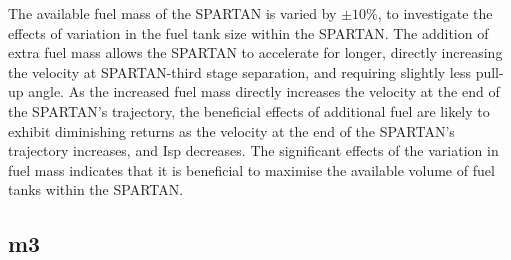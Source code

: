 The available fuel mass of the SPARTAN is varied by $\pm 10\%$, to investigate the effects of variation in the fuel tank size within the SPARTAN.
 The addition of extra fuel mass allows the SPARTAN to accelerate for longer, directly increasing the velocity at SPARTAN-third stage separation, and requiring slightly less pull-up angle. 
As the increased fuel mass directly increases the velocity at the end of the SPARTAN's trajectory, the beneficial effects of additional fuel are likely to exhibit diminishing returns as the velocity at the end of the SPARTAN's trajectory increases, and Isp decreases.
The significant effects of the variation in fuel mass indicates that it is beneficial to maximise the available volume of fuel tanks within the SPARTAN. 


\subsection{m3}

